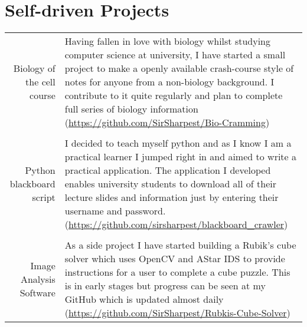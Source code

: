 \documentclass[a4paper,10pt]{article}
\begin{document}
\section{Self-driven Projects}

\begin{tabular}{r|p{11cm}}

  Biology of the cell course & Having fallen in love with biology whilst studying computer science at university, I have started a small project to make a openly available crash-course style of notes for anyone from a non-biology background. I contribute to it quite regularly and plan to complete full series of biology information (\href{https://github.com/SirSharpest/Bio-Cramming}{https://github.com/SirSharpest/Bio-Cramming})\\
  \\
  Python blackboard script& I decided to teach myself python and as I know I am a practical learner I jumped right in and aimed to write a practical application. The application I developed enables university students to download all of their lecture slides and information just by entering their username and password.(\href{https://github.com/sirsharpest/blackboard\_crawler}{https://github.com/sirsharpest/blackboard\_crawler})\\
  \\
  Image Analysis Software& As a side project I have started building a Rubik's cube solver which uses OpenCV and AStar IDS to provide instructions for a user to complete a cube puzzle. This is in early stages but progress can be seen at my GitHub which is updated almost daily (\href{https://github.com/SirSharpest/Rubkis-Cube-Solver}{https://github.com/SirSharpest/Rubkis-Cube-Solver})
\end{tabular}
\par 
\clearpage
\end{document}
